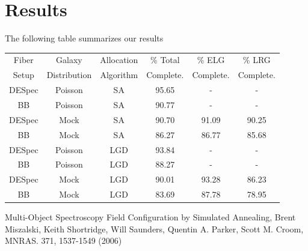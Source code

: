 \documentclass{article}
\begin{document}
\section{Results}

The following table summarizes our results

\begin{table}[!ht]
\begin{center}
\begin{tabular}{cccccc}\hline
Fiber & Galaxy & Allocation & \% Total & \% ELG & \% LRG\\
Setup & Distribution & Algorithm & Complete. &
Complete.&Complete.\\\hline  
DESpec & Poisson & SA & 95.65 & -& -\\
BB & Poisson & SA & 90.77 & -& -\\
DESpec & Mock & SA & 90.70 & 91.09 & 90.25 \\
BB & Mock & SA & 86.27 & 86.77 & 85.68\\
DESpec & Poisson & LGD & 93.84 & -& -\\
BB & Poisson & LGD & 88.27& -&-\\
DESpec & Mock & LGD & 90.01 & 93.28 & 86.23\\
BB & Mock & LGD & 83.69 & 87.78 & 78.95\\\hline
\end{tabular}
\end{center}
\label{Summary of the results.}
\end{table}



\begin{thebibliography}{10}
 Multi-Object Spectroscopy
  Field Configuration by  Simulated Annealing, Brent Miszalski, Keith
  Shortridge, Will  Saunders, Quentin A. Parker, Scott M. Croom,
  MNRAS. 371, 1537-1549  (2006)  
\end{thebibliography}
\end{document}
